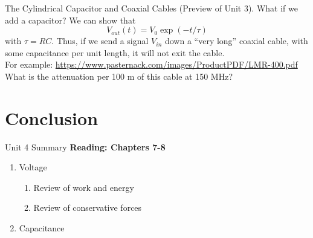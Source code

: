 \documentclass{beamer}
\begin{document}
\begin{frame}{The Cylindrical Capacitor and Coaxial Cables}
(Preview of Unit 3).  What if we add a capacitor?
We can show that
\begin{equation}
V_{out}(t) = V_0 \exp(-t/\tau)
\end{equation}
with $\tau = RC$.  Thus, if we send a signal $V_{in}$ down a ``very long'' coaxial cable, with some capacitance per unit length, it will not exit the cable. \\ \vspace{0.5cm}
For example: \url{https://www.pasternack.com/images/ProductPDF/LMR-400.pdf} \\ \vspace{0.5cm}
What is the attenuation per 100 m of this cable at 150 MHz?
\end{frame}

\section{Conclusion}

\begin{frame}{Unit 4 Summary}
\textbf{Reading: Chapters 7-8}
\begin{enumerate}
\item Voltage
\begin{enumerate}
\item Review of work and energy
\item Review of conservative forces
\end{enumerate}
\item Capacitance
\end{enumerate}
\end{frame}
\end{document}
